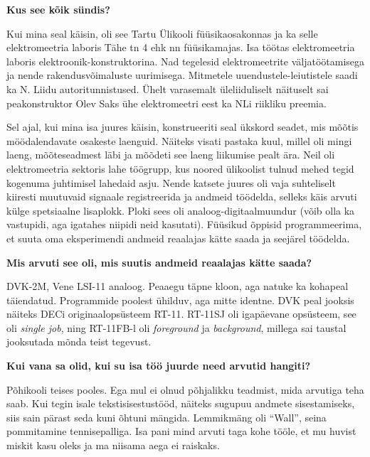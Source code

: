 \textbf{Kus see kõik sündis?}

Kui mina seal käisin, oli see Tartu Ülikooli
füüsikaosakonnas ja ka selle elektromeetria laboris
Tähe tn 4 ehk nn füüsikamajas. Isa töötas elektromeetria laboris
elektroonik-konstruktorina. Nad tegelesid elektromeetrite väljatöötamisega ja
nende rakendusvõimaluste uurimisega. Mitmetele uuendustele-leiutistele saadi ka
N. Liidu autoritunnistused. Ühelt varasemalt üleliiduliselt näituselt sai
peakonstruktor Olev Saks ühe elektromeetri eest ka NLi riikliku preemia.

Sel ajal, kui mina isa juures käisin, konstrueeriti seal ükskord
seadet, mis mõõtis möödalendavate osakeste laenguid. Näiteks visati pastaka
kuul, millel oli mingi laeng, mõõteseadmest läbi ja mõõdeti see laeng liikumise
pealt ära. Neil oli elektromeetria sektoris lahe töögrupp, kus noored
ülikoolist tulnud mehed tegid kogenuma juhtimisel lahedaid asju. Nende katsete
juures oli vaja suhteliselt kiiresti muutuvaid signaale registreerida ja
andmeid töödelda, selleks käis arvuti külge spetsiaalne lisaplokk. Ploki sees
oli analoog-digitaalmuundur (võib olla ka vastupidi, aga igatahes niipidi neid
kasutati). Füüsikud õppisid programmeerima, et suuta oma eksperimendi andmeid
reaalajas kätte saada ja seejärel töödelda.

\textbf{Mis arvuti see oli, mis suutis andmeid 
reaalajas kätte saada?}

DVK-2M, Vene LSI-11
analoog. Peaaegu täpne kloon, aga natuke ka kohapeal täiendatud. Programmide
poolest ühilduv, aga mitte identne. DVK peal jooksis näiteks DECi
originaalopsüsteem RT-11. RT-11SJ oli igapäevane opsüsteem, see
oli \emph{single job}, ning RT-11FB-l oli \emph{foreground} ja \emph{background},
millega sai taustal jooksutada mõnda teist tegevust.

\textbf{Kui vana sa olid, kui su isa töö juurde need arvutid hangiti?}

Põhikooli teises pooles. Ega mul ei olnud põhjalikku teadmist, mida
arvutiga teha saab. Kui tegin isale tekstisisestustööd, näiteks sugupuu
andmete sisestamiseks, siis sain pärast seda kuni õhtuni mängida. Lemmikmäng
oli \enquote{Wall}, seina pommitamine tennisepalliga. Isa pani mind
arvuti taga kohe tööle, et mu huvist miskit kasu oleks ja ma niisama
aega ei raiskaks. 

